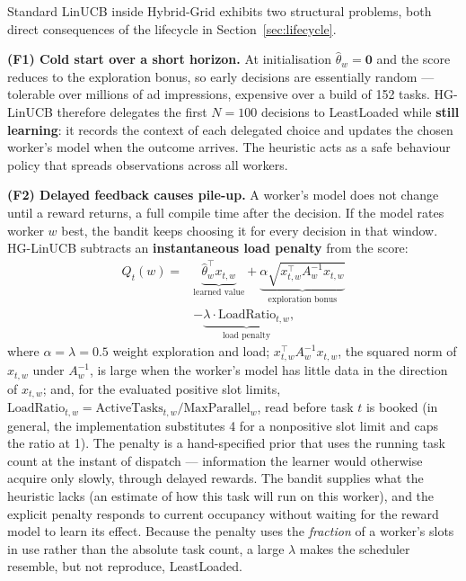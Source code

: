 \documentclass[final,5p,times,twocolumn]{elsarticle}
\begin{document}
Standard LinUCB inside Hybrid-Grid exhibits two structural problems, both direct consequences of the lifecycle in Section~\ref{sec:lifecycle}.

\textbf{(F1) Cold start over a short horizon.} At initialisation $\hat\theta_w=\mathbf{0}$ and the score reduces to the exploration bonus, so early decisions are essentially random --- tolerable over millions of ad impressions, expensive over a build of 152 tasks. HG-LinUCB therefore delegates the first $N=100$ decisions to LeastLoaded while \textbf{still learning}: it records the context of each delegated choice and updates the chosen worker's model when the outcome arrives. The heuristic acts as a safe behaviour policy that spreads observations across all workers.

\textbf{(F2) Delayed feedback causes pile-up.} A worker's model does not change until a reward returns, a full compile time after the decision. If the model rates worker $w$ best, the bandit keeps choosing it for every decision in that window. HG-LinUCB subtracts an \textbf{instantaneous load penalty} from the score:
\begin{equation}
\begin{split}
Q_t(w)={}&\underbrace{\hat{\theta}_w^\top x_{t,w}}_{\text{learned value}}+\underbrace{\alpha\sqrt{x_{t,w}^\top A_w^{-1}x_{t,w}}}_{\text{exploration bonus}}\\
&-\underbrace{\lambda\cdot\text{LoadRatio}_{t,w}}_{\text{load penalty}},
\end{split}
\end{equation}
where $\alpha=\lambda=0.5$ weight exploration and load; $x_{t,w}^\top A_w^{-1}x_{t,w}$, the squared norm of $x_{t,w}$ under $A_w^{-1}$, is large when the worker's model has little data in the direction of $x_{t,w}$; and, for the evaluated positive slot limits, $\text{LoadRatio}_{t,w}=\text{ActiveTasks}_{t,w}/\text{MaxParallel}_w$, read before task $t$ is booked (in general, the implementation substitutes 4 for a nonpositive slot limit and caps the ratio at 1). The penalty is a hand-specified prior that uses the running task count at the instant of dispatch --- information the learner would otherwise acquire only slowly, through delayed rewards. The bandit supplies what the heuristic lacks (an estimate of how this task will run on this worker), and the explicit penalty responds to current occupancy without waiting for the reward model to learn its effect. Because the penalty uses the \emph{fraction} of a worker's slots in use rather than the absolute task count, a large $\lambda$ makes the scheduler resemble, but not reproduce, LeastLoaded.
\end{document}
